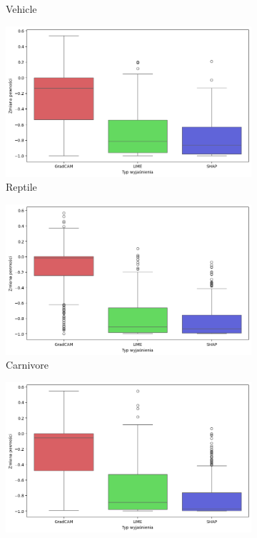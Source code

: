 \begin{figure}[h]
\begin{subfigure}[b]{0.3\textwidth}
		\caption{Vehicle}  \label{rys:base_confidence_exp_vehicle}
	\end{subfigure}
	\begin{subfigure}[b]{0.3\textwidth}
		\centering\includegraphics[width=.9\textwidth]{img/base_confidence_exp_reptile}
		\caption{Reptile}  \label{rys:base_confidence_exp_reptile}
	\end{subfigure}
	\begin{subfigure}[b]{0.3\textwidth}
		\centering\includegraphics[width=.9\textwidth]{img/base_confidence_exp_carnivore}
		\caption{Carnivore}  \label{rys:base_confidence_exp_carnivore}
	\end{subfigure}
	\begin{subfigure}[b]{0.3\textwidth}
		\centering\includegraphics[width=.9\textwidth]{img/base_confidence_exp_insect}

\end{subfigure}
\end{figure}
